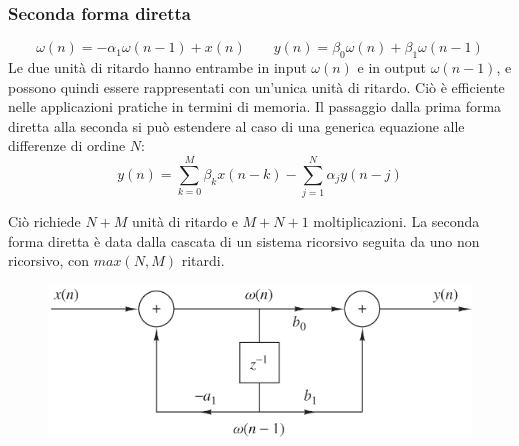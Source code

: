 \subsubsection{Seconda forma diretta}
$$\omega(n) = -\alpha_1\omega(n-1) + x(n) \qquad y(n) = \beta_0\omega(n) + \beta_1\omega(n-1)$$
Le due unità di ritardo hanno entrambe in input $\omega(n)$ e in output $\omega(n-1)$, e possono quindi essere rappresentati con un'unica unità di ritardo. Ciò è efficiente nelle applicazioni pratiche in termini di memoria. 
Il passaggio dalla prima forma diretta alla seconda si può estendere al caso di una generica equazione alle differenze di ordine $N$:
$$y(n) = \sum_{k=0}^{M}\beta_kx(n-k) - \sum_{j=1}^{N}\alpha_jy(n-j)$$

\newpage
Ciò richiede $N + M$ unità di ritardo e $M + N + 1$ moltiplicazioni. La seconda forma diretta è data dalla cascata di un sistema ricorsivo seguita da uno non ricorsivo, con $max(N, M)$ ritardi.
\begin{figure}[h]
	\centering
	\includegraphics[scale=0.4]{Lezioni/Immagini/diretta2}
\end{figure}
